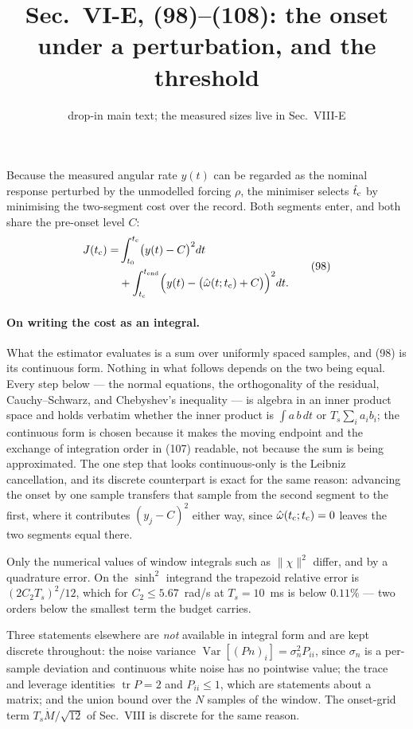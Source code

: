 \documentclass[10pt]{article}
\title{\vspace{-16mm}\textbf{Sec.~VI-E, (98)--(108): the onset under a
perturbation, and the threshold}\vspace{-3mm}}
\date{\small drop-in main text; the measured sizes live in Sec.~VIII-E}
\newcommand{\tc}{t_{\rm c}}
\newcommand{\tend}{t_{\rm end}}
\begin{document}
\maketitle

Because the measured angular rate $y(t)$ can be regarded as the nominal
response perturbed by the unmodelled forcing $\rho$, the minimiser
selects $\hat\tc$ by minimising the two-segment cost over the record.
Both segments enter, and both share the pre-onset level $C$:
\begin{equation}
\begin{aligned}
  J(\tc) = &\int_{t_0}^{\tc}\bigl(y(t) - C\bigr)^2dt \\
    &+ \int_{\tc}^{\tend}
       \Bigl(y(t) - \bigl(\hat\omega(t;\tc) + C\bigr)\Bigr)^2dt .
\end{aligned}
  \tag{98}
\end{equation}

\paragraph{On writing the cost as an integral.} What the estimator
evaluates is a sum over uniformly spaced samples, and (98) is its
continuous form. Nothing in what follows depends on the two being
equal. Every step below --- the normal equations, the orthogonality of
the residual, Cauchy--Schwarz, and Chebyshev's inequality --- is algebra
in an inner product space and holds verbatim whether the inner product
is $\int a\,b\,dt$ or $T_s\sum_i a_ib_i$; the continuous form is chosen
because it makes the moving endpoint and the exchange of integration
order in (107) readable, not because the sum is being approximated. The
one step that looks continuous-only is the Leibniz cancellation, and its
discrete counterpart is exact for the same reason: advancing the onset
by one sample transfers that sample from the second segment to the
first, where it contributes $(y_j - C)^2$ either way, since
$\hat\omega(\tc;\tc) = 0$ leaves the two segments equal there.

Only the numerical values of window integrals such as
$\|\chi\|^2$ differ, and by a quadrature error. On the $\sinh^2$
integrand the trapezoid relative error is $(2C_2T_s)^2/12$, which for
$C_2\le5.67$~rad/s at $T_s = 10$~ms is below $0.11\%$ --- two orders
below the smallest term the budget carries.

Three statements elsewhere are \emph{not} available in integral form and
are kept discrete throughout: the noise variance
$\operatorname{Var}[(Pn)_i] = \sigma_n^2P_{ii}$, since $\sigma_n$ is a
per-sample deviation and continuous white noise has no pointwise value;
the trace and leverage identities $\operatorname{tr}P = 2$ and
$P_{ii}\le1$, which are statements about a matrix; and the union bound
over the $N$ samples of the window. The onset-grid term
$T_s\dot M/\sqrt{12}$ of Sec.~VIII is discrete for the same reason.
\end{document}
